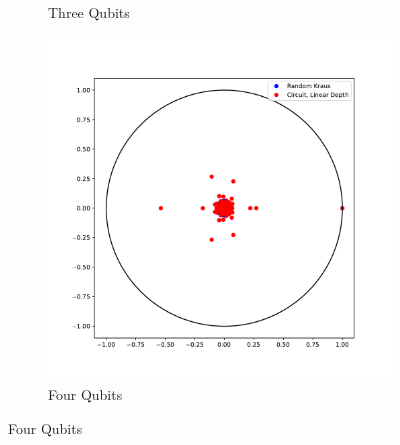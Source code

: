 \documentclass{article}
\begin{document}
\begin{figure}[htbp]
\begin{subfigure}[t]{0.3\textwidth}
\caption{Three Qubits}
\label{fig:figure14_5}
\end{subfigure}\hfill
\begin{subfigure}[t]{0.3\textwidth}
    \includegraphics[width=\textwidth]{../figures/fourQubit_linearDepth}
\caption{Four Qubits}
\label{fig:figure14_6}
\end{subfigure}


\end{figure}
\end{document}
